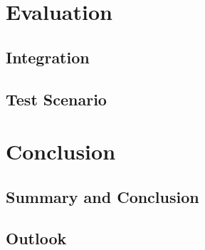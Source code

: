 \chapter{Evaluation}
\section{Integration}
\section{Test Scenario}
\chapter{Conclusion}
\section{Summary and Conclusion}
\section{Outlook}